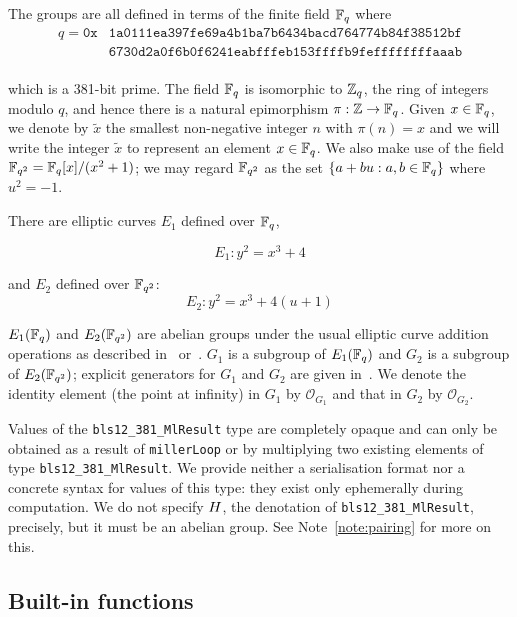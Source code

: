 \noindent The groups are all defined in terms of the finite field $\mathbb{F}_q$ where
\begin{align*}
q = \mathtt{0x}&\mathtt{1a0111ea397fe69a4b1ba7b6434bacd764774b84f38512bf}\\
              &\mathtt{6730d2a0f6b0f6241eabfffeb153ffffb9feffffffffaaab}\\
\end{align*}

\noindent which is a 381-bit prime. The field $\mathbb{F}_q$ is isomorphic to $\mathbb{Z}_q$, the ring of
integers modulo $q$, and hence there is a natural epimorphism
$\pi:\mathbb{Z} \rightarrow \mathbb{F}_q$.  Given $x \in \mathbb{F}_q$, we denote by $\tilde{x}$ the
smallest non-negative integer $n$ with $\pi(n) = x$ and we will write the
integer $\tilde{x}$ to represent an element $x \in \mathbb{F}_q$.  We also make use of
the field $\mathbb{F}_{q^2} = \mathbb{F}_q[x]/(x^2+1)$; we may regard $\mathbb{F}_{q^2}$ as the set $\{a+bu:
a,b \in \mathbb{F}_q\}$ where $u^2=-1$.

\medskip\noindent There are elliptic curves $E_1$ defined over $\mathbb{F}_q$,

$$
E_1: y^2 = x^3 + 4
$$

\noindent and $E_2$ defined over $\mathbb{F}_{q^2}$:
$$
E_2: y^2 = x^3 + 4(u+1)
$$


\medskip

\noindent $E_1(\mathbb{F}_q)$ and  $E_2(\mathbb{F}_{q^2})$  are abelian groups under the
usual elliptic curve addition operations as described
in~\cite[III.2]{Silverman-Arithmetic-EC} or~\cite[2.1]{Costello-pairings}.
$G_1$ is a subgroup of $E_1(\mathbb{F}_q)$ and $G_2$ is a subgroup of $E_2(\mathbb{F}_{q^2})$;
explicit generators for $G_1$ and $G_2$ are given
in~\cite[4.2.1]{IETF-pairing-friendly-curves}.  We denote the identity element
(the point at infinity) in $G_1$ by $\mathcal{O}_{G_1}$ and that in $G_2$ by
$\mathcal{O}_{G_2}$.

\bigskip
\noindent Values of the \texttt{bls12\_381\_MlResult} type are completely
opaque and can only be obtained as a result of \texttt{millerLoop} or by
multiplying two existing elements of type \texttt{bls12\_381\_MlResult}.  We
provide neither a serialisation format nor a concrete syntax for values of this
type: they exist only ephemerally during computation.  We do not
specify $H$, the denotation of \texttt{bls12\_381\_MlResult}, precisely,
but it must be an abelian group. See Note~\ref{note:pairing} for more on this.

\subsection{Built-in functions}
\label{sec:future-built-in-functions}

